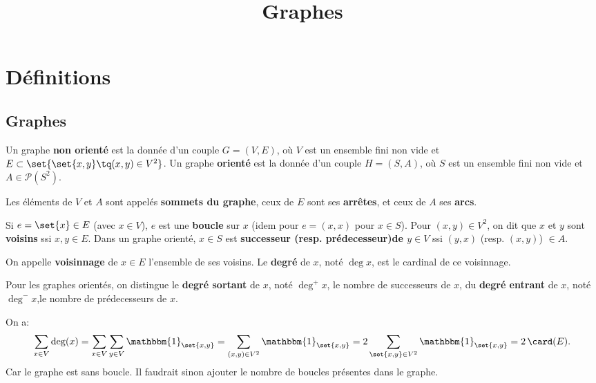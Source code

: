 \documentclass{scrartcl}
\title{Graphes}
\author{}
\date{}
\begin{document}
	\maketitle
	\section{Définitions}
		\subsection{Graphes}
			 Un graphe \textbf{non orienté} est la donnée 
			d'un couple $G = (V,E)$,
			où $V$ est un ensemble fini non vide 
			et $E \subset \set{\set{x,y} \tq (x,y) \in V^2}$.
			Un graphe \textbf{orienté} est la donnée d'un couple $H = (S,A)$,
			où $S$ est un ensemble fini non vide et 
			$A \in \mathcal{P}(S^2)$.

			Les éléments de $V$ et $A$ sont appelés \textbf{sommets du graphe}, 
			ceux de $E$ sont ses \textbf{arrêtes}, et ceux de $A$ ses \textbf{arcs}.

			Si $e = \set{x} \in E$ (avec $x \in V$), $e$ est une \textbf{boucle} sur $x$
			(idem pour $e = (x,x)$ pour $x \in S$). 
			Pour $(x,y) \in V^2$, on dit que $x$ et $y$ sont \textbf{voisins} ssi ${x,y} \in E$.
			Dans un graphe orienté, $x \in S$ est \textbf{successeur (resp. prédecesseur)de $y \in V$} ssi $(y,x)$ (resp. $(x,y)$) $\in A$.

			On appelle \textbf{voisinnage} de $x \in E$ l'ensemble de ses voisins.
			Le \textbf{degré} de $x$, noté $\deg x$, est le cardinal de ce voisinnage.

			Pour les graphes orientés, on distingue le \textbf{degré sortant} de $x$, noté $\deg^+ x$, le nombre de successeurs de $x$,
			du \textbf{degré entrant} de $x$, noté $\deg^- x$,le nombre de prédecesseurs de $x$.


			\begin{demo}
				\item On a:
				\[
					\sum_{x \in V} \deg(x)= \sum_{x\in V} \sum_{y\in V} \mathbbm{1}_\set{x,y} = \sum_{(x,y) \in V^2} \mathbbm{1}_\set{x,y}
					= 2\sum_{\set{x,y} \in V^2} \mathbbm{1}_\set{x,y} = 2\,\card(E).
				\]
				Car le graphe est sans boucle. Il faudrait sinon ajouter le nombre de boucles présentes dans le graphe.
			\end{demo}
\end{document}
